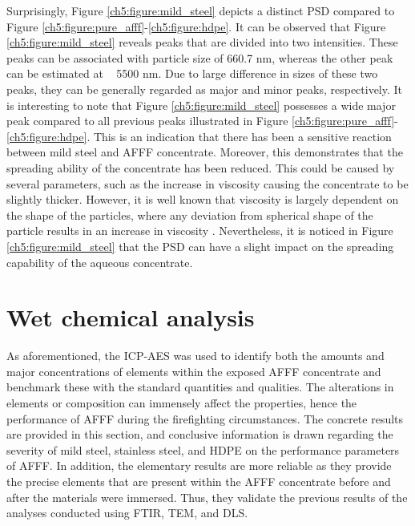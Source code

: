Surprisingly, Figure \ref{ch5:figure:mild_steel} depicts a distinct PSD compared to Figure \ref{ch5:figure:pure_afff}-\ref{ch5:figure:hdpe}. It can be observed that Figure \ref{ch5:figure:mild_steel} reveals peaks that are divided into two intensities. These peaks can be associated with particle size of 660.7 nm, whereas the other peak can be estimated at ~ 5500 nm.  Due to large difference in sizes of these two peaks, they can be generally regarded as major and minor peaks, respectively.  It is interesting to note that Figure \ref{ch5:figure:mild_steel} possesses a wide major peak compared to all previous peaks illustrated in Figure \ref{ch5:figure:pure_afff}-\ref{ch5:figure:hdpe}. This is an indication that there has been a sensitive reaction between mild steel and AFFF concentrate. Moreover, this demonstrates that the spreading ability of the concentrate has been reduced. This could be caused by several parameters, such as the increase in viscosity causing the concentrate to be slightly thicker. However, it is well known that viscosity is largely dependent on the shape of the particles, where any deviation from spherical shape of the particle results in an increase in viscosity \cite{klein2011transmission}. Nevertheless, it is noticed in Figure \ref{ch5:figure:mild_steel} that the PSD can have a slight impact on the spreading capability of the aqueous concentrate.

\section{Wet chemical analysis}
As aforementioned, the ICP-AES was used to identify both the amounts and major concentrations of elements within the exposed AFFF concentrate and benchmark these with the standard quantities and qualities. The alterations in elements or composition can immensely affect the properties, hence the performance of AFFF during the firefighting circumstances. The concrete results are provided in this section, and conclusive information is drawn regarding the severity of mild steel, stainless steel, and HDPE on the performance parameters of AFFF. In addition, the elementary results are more reliable as they provide the precise elements that are present within the AFFF concentrate before and after the materials were immersed. Thus, they validate the previous results of the analyses conducted using FTIR, TEM, and DLS.

